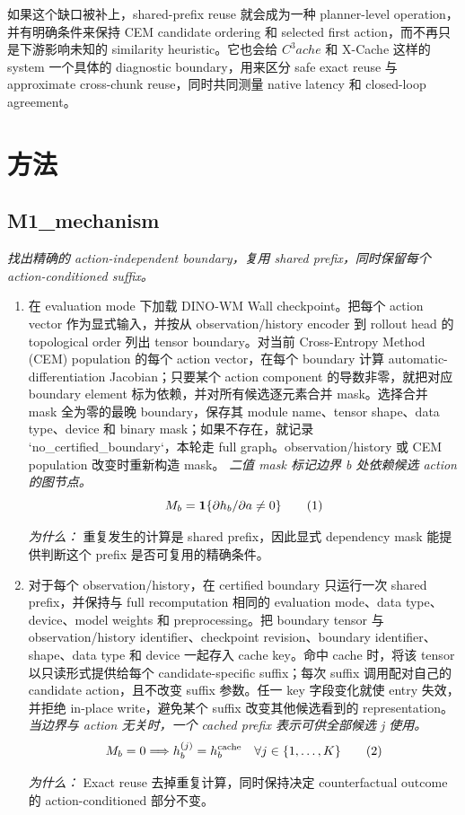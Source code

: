 \documentclass[10pt,a4paper]{article}
\begin{document}
如果这个缺口被补上，shared-prefix reuse 就会成为一种 planner-level operation，并有明确条件来保持 CEM candidate ordering 和 selected first action，而不再只是下游影响未知的 similarity heuristic。它也会给 \(C^{3}ache\) 和 X-Cache 这样的 system 一个具体的 diagnostic boundary，用来区分 safe exact reuse 与 approximate cross-chunk reuse，同时共同测量 native latency 和 closed-loop agreement。
\section*{方法}
\subsection*{M1\_mechanism}
\emph{找出精确的 action-independent boundary，复用 shared prefix，同时保留每个 action-conditioned suffix。}
\begin{enumerate}[leftmargin=*,start=1]
  \item 在 evaluation mode 下加载 DINO-WM Wall checkpoint。把每个 action vector 作为显式输入，并按从 observation/history encoder 到 rollout head 的 topological order 列出 tensor boundary。对当前 Cross-Entropy Method (CEM) population 的每个 action vector，在每个 boundary 计算 automatic-differentiation Jacobian；只要某个 action component 的导数非零，就把对应 boundary element 标为依赖，并对所有候选逐元素合并 mask。选择合并 mask 全为零的最晚 boundary，保存其 module name、tensor shape、data type、device 和 binary mask；如果不存在，就记录 `no\_certified\_boundary`，本轮走 full graph。observation/history 或 CEM population 改变时重新构造 mask。
\noindent\emph{二值 mask 标记边界 b 处依赖候选 action 的图节点。}
\begin{equation}
\resizebox{\ifdim\width>\linewidth \linewidth\else\width\fi}{!}{$\displaystyle M_b = \mathbf{1}\{\partial h_b / \partial a \neq 0\}$} \tag{1}
\end{equation}
\par\emph{为什么：} 重复发生的计算是 shared prefix，因此显式 dependency mask 能提供判断这个 prefix 是否可复用的精确条件。
  \item 对于每个 observation/history，在 certified boundary 只运行一次 shared prefix，并保持与 full recomputation 相同的 evaluation mode、data type、device、model weights 和 preprocessing。把 boundary tensor 与 observation/history identifier、checkpoint revision、boundary identifier、shape、data type 和 device 一起存入 cache key。命中 cache 时，将该 tensor 以只读形式提供给每个 candidate-specific suffix；每次 suffix 调用配对自己的 candidate action，且不改变 suffix 参数。任一 key 字段变化就使 entry 失效，并拒绝 in-place write，避免某个 suffix 改变其他候选看到的 representation。
\noindent\emph{当边界与 action 无关时，一个 cached prefix 表示可供全部候选 j 使用。}
\begin{equation}
\resizebox{\ifdim\width>\linewidth \linewidth\else\width\fi}{!}{$\displaystyle M_b=0 \Longrightarrow h_b^{(j)} = h_b^{\mathrm{cache}} \quad \forall j \in \{1,\ldots,K\}$} \tag{2}
\end{equation}
\par\emph{为什么：} Exact reuse 去掉重复计算，同时保持决定 counterfactual outcome 的 action-conditioned 部分不变。
\end{enumerate}
\end{document}
